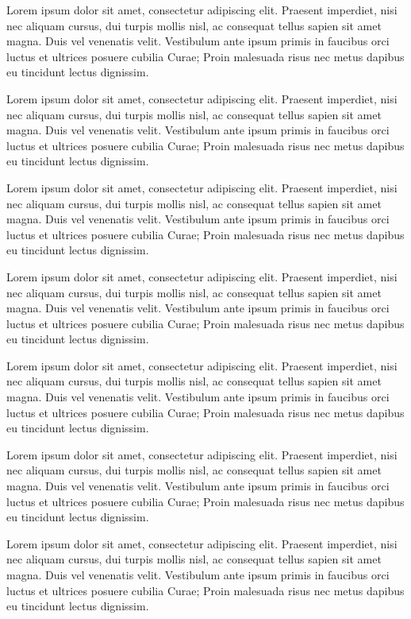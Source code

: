 Lorem ipsum dolor sit amet, consectetur adipiscing elit. Praesent imperdiet, nisi 
nec aliquam cursus, dui turpis mollis nisl, ac consequat tellus sapien sit amet 
magna. Duis vel venenatis velit. Vestibulum ante ipsum primis in faucibus orci 
luctus et ultrices posuere cubilia Curae; Proin malesuada risus nec metus dapibus 
eu tincidunt lectus dignissim. 

Lorem ipsum dolor sit amet, consectetur adipiscing elit. Praesent imperdiet, nisi 
nec aliquam cursus, dui turpis mollis nisl, ac consequat tellus sapien sit amet 
magna. Duis vel venenatis velit. Vestibulum ante ipsum primis in faucibus orci 
luctus et ultrices posuere cubilia Curae; Proin malesuada risus nec metus dapibus 
eu tincidunt lectus dignissim. 

Lorem ipsum dolor sit amet, consectetur adipiscing elit. Praesent imperdiet, nisi 
nec aliquam cursus, dui turpis mollis nisl, ac consequat tellus sapien sit amet 
magna. Duis vel venenatis velit. Vestibulum ante ipsum primis in faucibus orci 
luctus et ultrices posuere cubilia Curae; Proin malesuada risus nec metus dapibus 
eu tincidunt lectus dignissim. 

Lorem ipsum dolor sit amet, consectetur adipiscing elit. Praesent imperdiet, nisi 
nec aliquam cursus, dui turpis mollis nisl, ac consequat tellus sapien sit amet 
magna. Duis vel venenatis velit. Vestibulum ante ipsum primis in faucibus orci 
luctus et ultrices posuere cubilia Curae; Proin malesuada risus nec metus dapibus 
eu tincidunt lectus dignissim. 

Lorem ipsum dolor sit amet, consectetur adipiscing elit. Praesent imperdiet, nisi 
nec aliquam cursus, dui turpis mollis nisl, ac consequat tellus sapien sit amet 
magna. Duis vel venenatis velit. Vestibulum ante ipsum primis in faucibus orci 
luctus et ultrices posuere cubilia Curae; Proin malesuada risus nec metus dapibus 
eu tincidunt lectus dignissim. 

Lorem ipsum dolor sit amet, consectetur adipiscing elit. Praesent imperdiet, nisi 
nec aliquam cursus, dui turpis mollis nisl, ac consequat tellus sapien sit amet 
magna. Duis vel venenatis velit. Vestibulum ante ipsum primis in faucibus orci 
luctus et ultrices posuere cubilia Curae; Proin malesuada risus nec metus dapibus 
eu tincidunt lectus dignissim. 

Lorem ipsum dolor sit amet, consectetur adipiscing elit. Praesent imperdiet, nisi 
nec aliquam cursus, dui turpis mollis nisl, ac consequat tellus sapien sit amet 
magna. Duis vel venenatis velit. Vestibulum ante ipsum primis in faucibus orci 
luctus et ultrices posuere cubilia Curae; Proin malesuada risus nec metus dapibus 
eu tincidunt lectus dignissim. 

